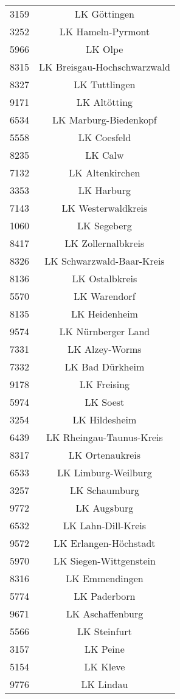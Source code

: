 \begin{tabular}{c c}
    3159&LK Göttingen\\ 
    3252&LK Hameln-Pyrmont\\ 
    5966&LK Olpe\\ 
    8315&LK Breisgau-Hochschwarzwald\\ 
    8327&LK Tuttlingen\\ 
    9171&LK Altötting\\ 
    6534&LK Marburg-Biedenkopf\\ 
    5558&LK Coesfeld\\ 
    8235&LK Calw\\ 
    7132&LK Altenkirchen\\ 
    3353&LK Harburg\\ 
    7143&LK Westerwaldkreis\\ 
    1060&LK Segeberg\\ 
    8417&LK Zollernalbkreis\\ 
    8326&LK Schwarzwald-Baar-Kreis\\ 
    8136&LK Ostalbkreis\\ 
    5570&LK Warendorf\\ 
    8135&LK Heidenheim\\ 
    9574&LK Nürnberger Land\\ 
    7331&LK Alzey-Worms\\ 
    7332&LK Bad Dürkheim\\ 
    9178&LK Freising\\ 
    5974&LK Soest\\ 
    3254&LK Hildesheim\\ 
    6439&LK Rheingau-Taunus-Kreis\\ 
    8317&LK Ortenaukreis\\ 
    6533&LK Limburg-Weilburg\\ 
    3257&LK Schaumburg\\ 
    9772&LK Augsburg\\ 
    6532&LK Lahn-Dill-Kreis\\ 
    9572&LK Erlangen-Höchstadt\\ 
    5970&LK Siegen-Wittgenstein\\ 
    8316&LK Emmendingen\\ 
    5774&LK Paderborn\\ 
    9671&LK Aschaffenburg\\ 
    5566&LK Steinfurt\\ 
    3157&LK Peine\\ 
    5154&LK Kleve\\ 
    9776&LK Lindau\\ 

\end{tabular}
